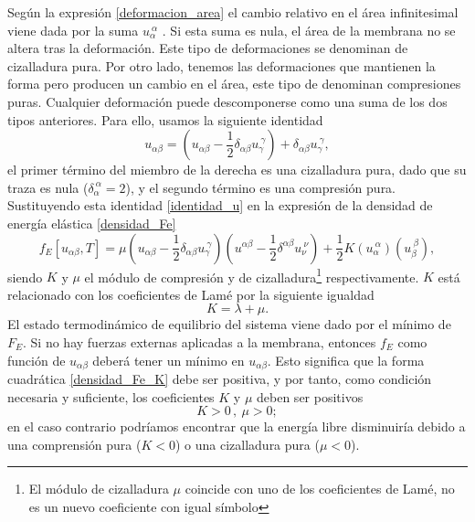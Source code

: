 Según la expresión \eqref{deformacion_area} el cambio relativo en el área infinitesimal
viene dada por la suma $u_{\alpha}^{\ \alpha}$ . Si esta suma es nula, el área
de la membrana no se altera tras la deformación. Este tipo de deformaciones se
denominan de cizalladura pura. Por otro lado, tenemos las deformaciones que
mantienen la forma pero producen un cambio en el área, este tipo de denominan
compresiones puras. Cualquier deformación puede descomponerse como una suma de
los dos tipos anteriores. Para ello, usamos la siguiente identidad
\begin{equation}\label{identidad_u}
u_{\alpha\beta}=(u_{\alpha\beta}-\frac{1}{2}\delta_{\alpha\beta}u_{\gamma}^{\
  \gamma})+\delta_{\alpha\beta}u_{\gamma}^{\ \gamma},
\end{equation}
el primer término del miembro de la derecha es una cizalladura pura, dado que
su traza es nula ($\delta_{\alpha}^{\ \alpha}=2$), y el segundo término es una
compresión pura. Sustituyendo esta identidad \eqref{identidad_u} en la expresión de la densidad de
energía elástica \eqref{densidad_Fe}
\begin{equation}\label{densidad_Fe_K}
f_E[u_{\alpha\beta},T]=
\mu \left(u_{\alpha\beta}-\frac{1}{2}\delta_{\alpha\beta}u_{\gamma}^{\ \gamma}\right)
    \left(u^{\alpha\beta}-\frac{1}{2}\delta^{\alpha\beta}u_{\nu}^{\ \nu}\right)+
\frac{1}{2}K(u_{\alpha}^{\ \alpha})(u_{\beta}^{\ \beta}),
\end{equation}
siendo $K$ y $\mu$ el módulo de compresión y de
cizalladura\footnote{El módulo de cizalladura $\mu$ coincide con uno de los
  coeficientes de Lamé, no es un nuevo coeficiente con igual símbolo} respectivamente. $K$
está relacionado con los coeficientes de Lamé por la siguiente igualdad
\begin{equation*}
K=\lambda+\mu.
\end{equation*}
El estado termodinámico de equilibrio del sistema viene dado por el mínimo de
$F_E$. Si no hay fuerzas externas aplicadas a la membrana, entonces $f_E$ como
función de $u_{\alpha\beta}$ deberá tener un mínimo en $u_{\alpha\beta}$. Esto
significa que la forma cuadrática \eqref{densidad_Fe_K} debe ser positiva, y por
tanto, como condición necesaria y suficiente, los coeficientes $K$ y $\mu$ deben ser positivos
\begin{equation*}
K>0\, ,\ \mu>0;
\end{equation*}
en el caso contrario podríamos encontrar que la energía libre disminuiría debido a una
comprensión pura ($K<0$) o una cizalladura pura ($\mu<0$).

